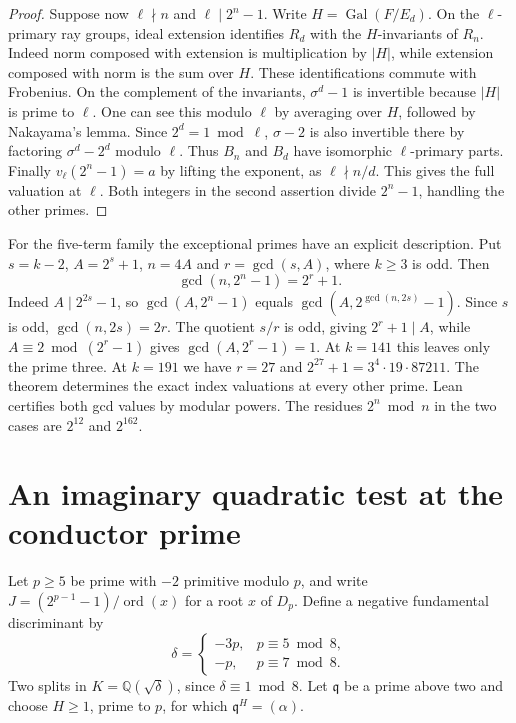 \documentclass[11pt]{article}
\newcommand{\ord}{\operatorname{ord}}
\begin{document}
\begin{proof}
Suppose now \(\ell\nmid n\) and \(\ell\mid2^n-1\). Write
\(H=\operatorname{Gal}(F/E_d)\). On the \(\ell\)-primary ray
groups, ideal extension identifies \(R_d\) with the \(H\)-invariants
of \(R_n\). Indeed norm composed with extension is multiplication by
\(|H|\), while extension composed with norm is the sum over \(H\).
These identifications commute with Frobenius. On the complement
of the invariants, \(\sigma^d-1\) is invertible because \(|H|\)
is prime to \(\ell\). One can see this modulo \(\ell\) by averaging
over \(H\), followed by Nakayama's lemma. Since \(2^d=1\bmod\ell\),
\(\sigma-2\) is also invertible there by factoring
\(\sigma^d-2^d\) modulo \(\ell\). Thus \(B_n\) and \(B_d\) have
isomorphic \(\ell\)-primary parts. Finally
\(v_\ell(2^n-1)=a\) by lifting the exponent, as \(\ell\nmid n/d\).
This gives the full valuation at \(\ell\). Both integers in the
second assertion divide \(2^n-1\), handling the other primes.
\end{proof}


For the five-term family the exceptional primes have an explicit description.
Put \(s=k-2\), \(A=2^s+1\), \(n=4A\) and \(r=\gcd(s,A)\), where \(k\ge3\) is odd. Then
\[
                    \gcd(n,2^n-1)=2^r+1.
\]
Indeed \(A\mid 2^{2s}-1\), so \(\gcd(A,2^n-1)\) equals
\(\gcd(A,2^{\gcd(n,2s)}-1)\). Since \(s\) is odd, \(\gcd(n,2s)=2r\).
The quotient \(s/r\) is odd, giving \(2^r+1\mid A\), while
\(A\equiv2\bmod(2^r-1)\) gives \(\gcd(A,2^r-1)=1\).
At \(k=141\) this leaves only the prime three. At \(k=191\) we
have \(r=27\) and \(2^{27}+1=3^4\cdot19\cdot87211\).
The theorem determines the exact index valuations at every other prime.
Lean certifies both gcd values by modular powers. The residues
\(2^n\bmod n\) in the two cases are \(2^{12}\) and \(2^{162}\).

\clearpage
\section{An imaginary quadratic test at the conductor prime}
\label{sec:twisted-conductor-prime}

Let \(p\ge5\) be prime with \(-2\) primitive modulo \(p\), and
write \(J=(2^{p-1}-1)/\ord(x)\) for a root \(x\) of \(D_p\).
Define a negative fundamental discriminant by
\[
 \delta=\begin{cases}-3p,&p\equiv5\bmod8,\\-p,&p\equiv7\bmod8.\end{cases}
\]
Two splits in \(K=\mathbb Q(\sqrt\delta)\), since
\(\delta\equiv1\bmod8\). Let \(\mathfrak q\) be a prime above two
and choose \(H\ge1\), prime to \(p\), for which
\(\mathfrak q^H=(\alpha)\).
\end{document}

